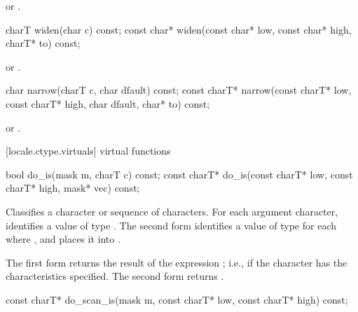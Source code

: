 \begin{itemdescr}
\pnum
\returns
{}
or
.
\end{itemdescr}

%
\begin{itemdecl}
charT       widen(char c) const;
const char* widen(const char* low, const char* high, charT* to) const;
\end{itemdecl}

\begin{itemdescr}
\pnum
\returns
{}
or
.
\end{itemdescr}

%
\begin{itemdecl}
char         narrow(charT c, char dfault) const;
const charT* narrow(const charT* low, const charT* high, char dfault, char* to) const;
\end{itemdecl}

\begin{itemdescr}
\pnum
\returns
{}
or
.
\end{itemdescr}

[locale.ctype.virtuals]{ virtual functions}

%
\begin{itemdecl}
bool         do_is(mask m, charT c) const;
const charT* do_is(const charT* low, const charT* high, mask* vec) const;
\end{itemdecl}

\begin{itemdescr}
\pnum
\effects
Classifies a character or sequence of characters.
For each argument character, identifies a value
of type
.
The second form identifies a value  of type
for each
where
,
and places it into
.

\pnum
\returns
The first form returns the result of the expression
;
i.e.,
if the character has the characteristics specified.
The second form returns .
\end{itemdescr}

%
\begin{itemdecl}
const charT* do_scan_is(mask m, const charT* low, const charT* high) const;
\end{itemdecl}

